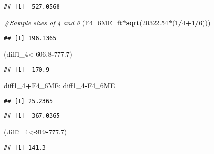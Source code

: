 \documentclass[]{article}
\newenvironment{Shaded}{\begin{snugshade}}{\end{snugshade}}
\newcommand{\KeywordTok}[1]{\textcolor[rgb]{0.13,0.29,0.53}{\textbf{#1}}}
\newcommand{\DataTypeTok}[1]{\textcolor[rgb]{0.13,0.29,0.53}{#1}}
\newcommand{\DecValTok}[1]{\textcolor[rgb]{0.00,0.00,0.81}{#1}}
\newcommand{\FloatTok}[1]{\textcolor[rgb]{0.00,0.00,0.81}{#1}}
\newcommand{\CommentTok}[1]{\textcolor[rgb]{0.56,0.35,0.01}{\textit{#1}}}
\newcommand{\OperatorTok}[1]{\textcolor[rgb]{0.81,0.36,0.00}{\textbf{#1}}}
\newcommand{\NormalTok}[1]{#1}
\begin{document}
\begin{verbatim}
## [1] -527.0568
\end{verbatim}

\begin{Shaded}
\begin{Highlighting}[]
\CommentTok{#Sample sizes of 4 and 6}
\NormalTok{(}\DataTypeTok{F4_6ME=}\NormalTok{ft}\OperatorTok{*}\KeywordTok{sqrt}\NormalTok{(}\FloatTok{20322.54}\OperatorTok{*}\NormalTok{(}\DecValTok{1}\OperatorTok{/}\DecValTok{4}\OperatorTok{+}\DecValTok{1}\OperatorTok{/}\DecValTok{6}\NormalTok{)))}
\end{Highlighting}
\end{Shaded}

\begin{verbatim}
## [1] 196.1365
\end{verbatim}

\begin{Shaded}
\begin{Highlighting}[]
\NormalTok{(diff1_}\DecValTok{4}\NormalTok{<-}\FloatTok{606.8}\OperatorTok{-}\FloatTok{777.7}\NormalTok{)}
\end{Highlighting}
\end{Shaded}

\begin{verbatim}
## [1] -170.9
\end{verbatim}

\begin{Shaded}
\begin{Highlighting}[]
\NormalTok{diff1_}\DecValTok{4}\OperatorTok{+}\NormalTok{F4_6ME; diff1_}\DecValTok{4}\OperatorTok{-}\NormalTok{F4_6ME}
\end{Highlighting}
\end{Shaded}

\begin{verbatim}
## [1] 25.2365
\end{verbatim}

\begin{verbatim}
## [1] -367.0365
\end{verbatim}

\begin{Shaded}
\begin{Highlighting}[]
\NormalTok{(diff3_}\DecValTok{4}\NormalTok{<-}\DecValTok{919}\OperatorTok{-}\FloatTok{777.7}\NormalTok{)}
\end{Highlighting}
\end{Shaded}

\begin{verbatim}
## [1] 141.3
\end{verbatim}
\end{document}

